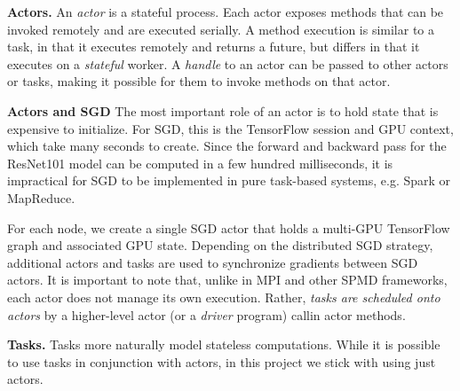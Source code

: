 \documentclass{article}
\begin{document}
{\bf Actors.} An \emph{actor} is a stateful process. Each actor exposes methods that
can be invoked remotely and are executed serially.
A method execution is similar to a task, in that it executes remotely and returns a future, but differs in that it executes on
a {\em stateful} worker. A {\em handle} to an actor can be passed to other actors or
tasks, making it possible for them to invoke methods on that actor.

\textbf{Actors and SGD}
The most important role of an actor is to hold state that is expensive to initialize. For SGD, this is the TensorFlow session and GPU context, which take many seconds to create. Since the forward and backward pass for the ResNet101 model can be computed in a few hundred milliseconds, it is impractical for SGD to be implemented in pure task-based systems, e.g. Spark or MapReduce.

For each node, we create a single SGD actor that holds a multi-GPU TensorFlow graph and associated GPU state. Depending on the distributed SGD strategy, additional actors and tasks are used to synchronize gradients between SGD actors. It is important to note that, unlike in MPI and other SPMD frameworks, each actor does not manage its own execution. Rather, \textit{tasks are scheduled onto actors} by a higher-level actor (or a \textit{driver} program) callin actor methods.

{\bf Tasks.} Tasks more naturally model stateless computations. While it is possible to use tasks in conjunction with actors, in this project we stick with using just actors.


\end{document}
